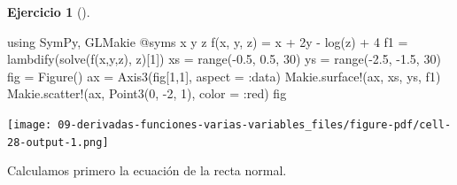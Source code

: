 \documentclass[
  a4paper,
]{scrreport}
\newenvironment{Shaded}{\begin{snugshade}}{\end{snugshade}}
\newcommand{\BuiltInTok}[1]{\textcolor[rgb]{0.00,0.23,0.31}{#1}}
\newcommand{\FloatTok}[1]{\textcolor[rgb]{0.68,0.00,0.00}{#1}}
\newcommand{\FunctionTok}[1]{\textcolor[rgb]{0.28,0.35,0.67}{#1}}
\newcommand{\ImportTok}[1]{\textcolor[rgb]{0.00,0.46,0.62}{#1}}
\newcommand{\NormalTok}[1]{\textcolor[rgb]{0.00,0.23,0.31}{#1}}
\newcommand{\OperatorTok}[1]{\textcolor[rgb]{0.37,0.37,0.37}{#1}}
\newcommand{\PreprocessorTok}[1]{\textcolor[rgb]{0.68,0.00,0.00}{#1}}
\newcommand{\SpecialCharTok}[1]{\textcolor[rgb]{0.37,0.37,0.37}{#1}}
\newcommand{\StringTok}[1]{\textcolor[rgb]{0.13,0.47,0.30}{#1}}
\theoremstyle{definition}
\newtheorem{exercise}{Ejercicio}[chapter]
\theoremstyle{remark}
\begin{document}
\begin{exercise}[]
\begin{tcolorbox}
\begin{Shaded}
\begin{Highlighting}[]
\ImportTok{using} \BuiltInTok{SymPy}\NormalTok{, }\BuiltInTok{GLMakie}
\PreprocessorTok{@syms}\NormalTok{ x y z}
\FunctionTok{f}\NormalTok{(x, y, z) }\OperatorTok{=}\NormalTok{ x }\OperatorTok{+} \FloatTok{2}\NormalTok{y }\OperatorTok{{-}} \FunctionTok{log}\NormalTok{(z) }\OperatorTok{+} \FloatTok{4}
\NormalTok{f1 }\OperatorTok{=} \FunctionTok{lambdify}\NormalTok{(}\FunctionTok{solve}\NormalTok{(}\FunctionTok{f}\NormalTok{(x,y,z), z)[}\FloatTok{1}\NormalTok{])}
\NormalTok{xs }\OperatorTok{=} \FunctionTok{range}\NormalTok{(}\OperatorTok{{-}}\FloatTok{0.5}\NormalTok{, }\FloatTok{0.5}\NormalTok{, }\FloatTok{30}\NormalTok{)}
\NormalTok{ys }\OperatorTok{=} \FunctionTok{range}\NormalTok{(}\OperatorTok{{-}}\FloatTok{2.5}\NormalTok{, }\OperatorTok{{-}}\FloatTok{1.5}\NormalTok{, }\FloatTok{30}\NormalTok{)}
\NormalTok{fig }\OperatorTok{=} \FunctionTok{Figure}\NormalTok{()}
\NormalTok{ax }\OperatorTok{=} \FunctionTok{Axis3}\NormalTok{(fig[}\FloatTok{1}\NormalTok{,}\FloatTok{1}\NormalTok{], aspect }\OperatorTok{=} \OperatorTok{:}\NormalTok{data)}
\NormalTok{Makie.}\FunctionTok{surface!}\NormalTok{(ax, xs, ys, f1)}
\NormalTok{Makie.}\FunctionTok{scatter!}\NormalTok{(ax, }\FunctionTok{Point3}\NormalTok{(}\FloatTok{0}\NormalTok{, }\OperatorTok{{-}}\FloatTok{2}\NormalTok{, }\FloatTok{1}\NormalTok{), color }\OperatorTok{=} \OperatorTok{:}\NormalTok{red)}
\NormalTok{fig}
\end{Highlighting}
\end{Shaded}

\texttt{[image: 09-derivadas-funciones-varias-variables\_files/figure-pdf/cell-28-output-1.png]}

Calculamos primero la ecuación de la recta normal.

\begin{Shaded}
\end{Shaded}


\end{tcolorbox}
\end{exercise}
\end{document}
